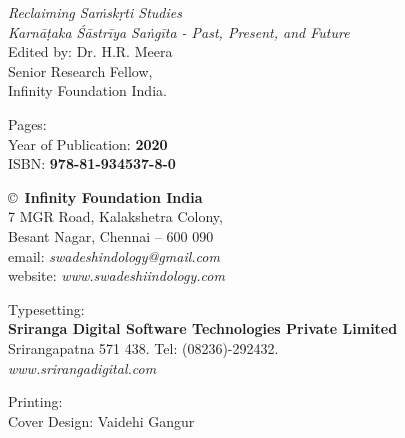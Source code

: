 \thispagestyle{empty}

\noindent
{\fontsize{9}{11}\selectfont\sl Reclaiming Saṁskṛti Studies}\\
\textit{Karnāṭaka Śāstrīya Saṅgīta - Past, Present, and Future}\\
Edited by: Dr. H.R. Meera\\
Senior Research Fellow,\\
Infinity Foundation India.
\vfill

\noindent
Pages: {\bf\pageref{bookend}}\\
Year of Publication: {\bf 2020}\\
ISBN: {\bf 978-81-934537-8-0}\\

\vfill

\noindent
\copyright\ {\bf Infinity Foundation India}\\ 
7 MGR Road, Kalakshetra Colony,\\ 
Besant Nagar, Chennai -- 600 090\\
email: {\sl swadeshindology@gmail.com}\\
website: {\sl www.swadeshiindology.com} 
\vfill

\noindent
Typesetting:\\ 
{\bf Sriranga Digital Software Technologies Private Limited}\\ 
Srirangapatna 571 438. Tel: (08236)-292432.\\
{\sl www.srirangadigital.com}
\vfill

\noindent
Printing:\\

\noindent
Cover Design: Vaidehi Gangur\\ 
